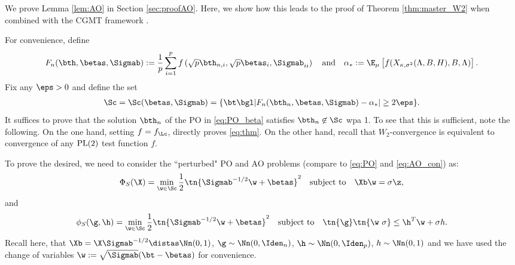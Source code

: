 

We prove Lemma \ref{lem:AO} in Section \ref{sec:proofAO}. Here, we show how this leads to the proof of Theorem \ref{thm:master_W2} when combined with the CGMT framework \cite{thrampoulidis2015lasso}.

 For convenience, 
 define 
$$F_n(\bth,\betas,\Sigmab):=\frac{1}{p} \sum_{i=1}^{p} f\left(\sqrt{p}\bth_{n,i},\sqrt{p}\betas_{i},\Sigmab_{ii}\right)\quad\text{and}\quad\alpha_*:=\E_\mu\left[f(X_{\kappa,\sigma^2}(\Lambda,B,H),B,\Lambda)\right].$$
Fix  any $\eps>0$ and define the set 
\begin{align}\label{eq:S_set}
\Sc = \Sc(\betas,\Sigmab) =\{\bt\bgl |F_n(\bth_n,\betas,\Sigmab)-\alpha_*|\geq 2\eps\}.
\end{align}
It suffices to prove that the solution $\bth_n$ of the PO in \eqref{eq:PO_beta} satisfies $\bth_n\not\in\Sc$ wpa 1. To see that this is sufficient, note the following. On the one hand, setting $f=f_\Lc$, directly proves \eqref{eq:thm}. On the other hand, recall that $W_2$-convergence is equivalent to convergence of any $\rm{PL}(2)$ test function $f$. 

To prove the desired, we need to consider the ``perturbed" PO and AO problems (compare to \eqref{eq:PO} and \eqref{eq:AO_con}) as:
\begin{align}\label{eq:PO_S}
\Phi_S(\X)=\min_{\w\in\Sc} \frac{1}{2}\tn{\Sigmab^{-1/2}\w+\betas}^2\quad\text{subject to}\quad \Xb\w=\sigma \z,
\end{align}
and
\begin{align}
\phi_S(\g,\h)=\min_{\w\in\Sc} \frac{1}{2}\tn{\Sigmab^{-1/2}\w+\betas}^2\quad\text{subject to}\quad \tn{\g}\tn{\w~{\sigma}}\leq \h^T\w+\sigma h.\label{eq:AO_S}
\end{align}%
Recall here, that $\Xb=\X\Sigmab^{-1/2}\distas\Nn(0,1)$, $\g\sim\Nn(0,\Iden_n)$, $\h\sim\Nn(0,\Iden_p)$, $h\sim \Nn(0,1)$ and we have used the change of variables $\w:=\sqrt{\Sigmab}(\bt-\betas)$ for convenience. 

